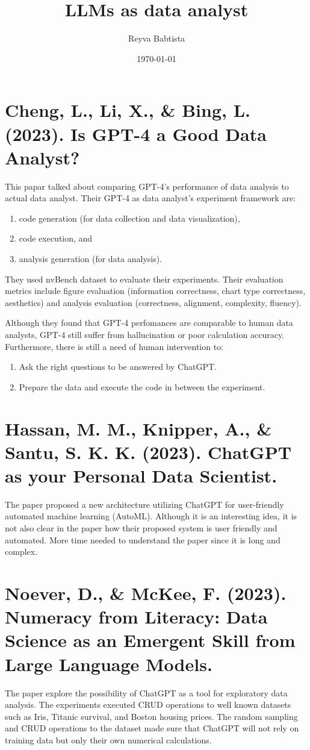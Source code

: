 \documentclass[11pt]{article}
\author{Reyva Babtista}
\date{\today}
\title{LLMs as data analyst}
\begin{document}
\maketitle

\section{Cheng, L., Li, X., \& Bing, L. (2023). Is GPT-4 a Good Data Analyst?}
\label{sec:org8c08a2d}
This papar talked about comparing GPT-4's
performance of data analysis to actual data analyst. Their GPT-4 as data
analyst's experiment framework are:
\begin{enumerate}
\item code generation (for data collection and data visualization),
\item code execution, and
\item analysis generation (for data analysis).
\end{enumerate}
They used nvBench dataset to evaluate their experiments. Their evaluation
metrics include figure evaluation (information correctness, chart type
correctness, aesthetics) and analysis evaluation (correctness, alignment,
complexity, fluency).

Although they found that GPT-4 perfomances are comparable to human data
analysts, GPT-4 still suffer from hallucination or poor calculation accuracy.
Furthermore, there is still a need of human intervention to:
\begin{enumerate}
\item Ask the right questions to be answered by ChatGPT.
\item Prepare the data and execute the code in between the experiment.
\end{enumerate}

\section{Hassan, M. M., Knipper, A., \& Santu, S. K. K. (2023). ChatGPT as your Personal Data Scientist.}
\label{sec:org744fe14}
The paper proposed a new architecture utilizing ChatGPT for user-friendly
automated machine learning (AutoML). Although it is an interesting idea, it is
not also clear in the paper how their proposed system is user friendly and
automated. More time needed to understand the paper since it is long and
complex.

\section{Noever, D., \& McKee, F. (2023). Numeracy from Literacy: Data Science as an Emergent Skill from Large Language Models.}
\label{sec:org5032006}
The paper explore the possibility of ChatGPT as a tool for exploratory data
analysis. The experiments executed CRUD operations to well known datasets such
as Iris, Titanic survival, and Boston housing prices. The random sampling and
CRUD operations to the dataset made sure that ChatGPT will not rely on training
data but only their own numerical calculations.
\end{document}
